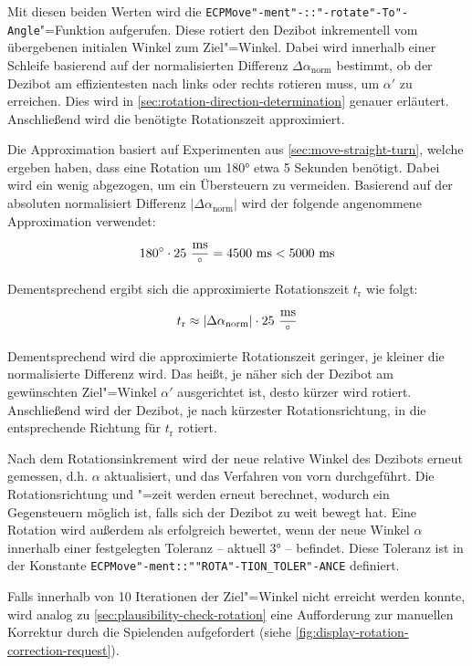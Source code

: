 Mit diesen beiden Werten wird die \texttt{ECPMove"-ment"-::"-rotate"-To"-Angle}"=Funktion aufgerufen. Diese rotiert den Dezibot inkrementell vom übergebenen initialen Winkel zum Ziel"=Winkel. Dabei wird innerhalb einer Schleife basierend auf der normalisierten Differenz $\Delta\alpha_{\text{norm}}$ bestimmt, ob der Dezibot am effizientesten nach links oder rechts rotieren muss, um $\alpha'$ zu erreichen. Dies wird in \autoref{sec:rotation-direction-determination} genauer erläutert. Anschließend wird die benötigte Rotationszeit approximiert.

Die Approximation basiert auf Experimenten aus \autoref{sec:move-straight-turn}, welche ergeben haben, dass eine Rotation um 180° etwa 5 Sekunden benötigt. Dabei wird ein wenig abgezogen, um ein Übersteuern zu vermeiden. Basierend auf der absoluten normalisiert Differenz $\vert\Delta\alpha_{\text{norm}}\vert$ wird der folgende angenommene Approximation verwendet:

\begin{equation*}
    180^\circ \cdot 25~\frac{\text{ms}}{^\circ} = 4500~\text{ms} < 5000~\text{ms}
\end{equation*}

Dementsprechend ergibt sich die approximierte Rotationszeit $t_{\text{r}}$ wie folgt:

\begin{equation*}
    t_{\text{r}} \approx \vert\Delta\alpha_{\text{norm}}\vert \cdot 25~\frac{\text{ms}}{^\circ}
\end{equation*}

Dementsprechend wird die approximierte Rotationszeit geringer, je kleiner die normalisierte Differenz wird. Das heißt, je näher sich der Dezibot am gewünschten Ziel"=Winkel $\alpha'$ ausgerichtet ist, desto kürzer wird rotiert. Anschließend wird der Dezibot, je nach kürzester Rotationsrichtung, in die entsprechende Richtung für $t_{\text{r}}$ rotiert.

Nach dem Rotationsinkrement wird der neue relative Winkel des Dezibots erneut gemessen, d.h. $\alpha$ aktualisiert, und das Verfahren von vorn durchgeführt. Die Rotationsrichtung und "=zeit werden erneut berechnet, wodurch ein Gegensteuern möglich ist, falls sich der Dezibot zu weit bewegt hat. Eine Rotation wird außerdem als erfolgreich bewertet, wenn der neue Winkel $\alpha$ innerhalb einer festgelegten Toleranz -- aktuell 3° -- befindet. Diese Toleranz ist in der Konstante \texttt{ECPMove"-ment::""ROTA"-TION\_TOLER"-ANCE} definiert.

Falls innerhalb von 10 Iterationen der Ziel"=Winkel nicht erreicht werden konnte, wird analog zu \autoref{sec:plausibility-check-rotation} eine Aufforderung zur manuellen Korrektur durch die Spielenden aufgefordert (siehe \autoref{fig:display-rotation-correction-request}).


